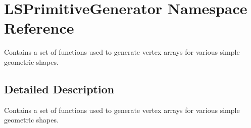 \hypertarget{namespace_l_s_primitive_generator}{}\section{L\+S\+Primitive\+Generator Namespace Reference}
\label{namespace_l_s_primitive_generator}


Contains a set of functions used to generate vertex arrays for various simple geometric shapes.  




\subsection{Detailed Description}
Contains a set of functions used to generate vertex arrays for various simple geometric shapes. 